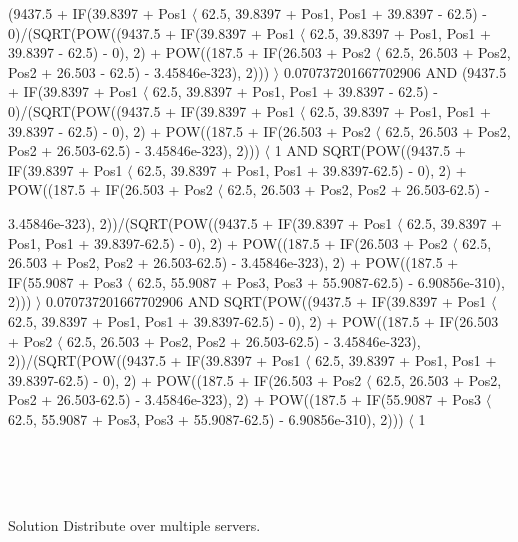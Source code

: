 \begin{frame}[plain]
(9437.5 + IF(39.8397 + Pos1 $\langle$ 62.5, 39.8397 + Pos1, Pos1 + 39.8397 - 62.5) - 0)/(SQRT(POW((9437.5 + IF(39.8397 + Pos1 $\langle$ 62.5, 39.8397 + Pos1, Pos1 + 39.8397 - 62.5) - 0), 2) + POW((187.5 + IF(26.503 + Pos2 $\langle$ 62.5, 26.503 + Pos2, Pos2 + 26.503 - 62.5) - 3.45846e-323), 2))) $\rangle$ 0.070737201667702906 AND (9437.5 + IF(39.8397 + Pos1 $\langle$ 62.5, 39.8397 + Pos1, Pos1 + 39.8397 - 62.5) - 0)/(SQRT(POW((9437.5 + IF(39.8397 + Pos1 $\langle$ 62.5, 39.8397 + Pos1, Pos1 + 39.8397 - 62.5) - 0), 2) + POW((187.5 + IF(26.503 + Pos2 $\langle$ 62.5, 26.503 + Pos2, Pos2 + 26.503-62.5) - 3.45846e-323), 2))) $\langle$ 1 AND SQRT(POW((9437.5 + IF(39.8397 + Pos1 $\langle$ 62.5, 39.8397 + Pos1, Pos1 + 39.8397-62.5) - 0), 2) + POW((187.5 + IF(26.503 + Pos2 $\langle$ 62.5, 26.503 + Pos2, Pos2 + 26.503-62.5) -
\end{frame}

\begin{frame}[plain]
3.45846e-323), 2))/(SQRT(POW((9437.5 + IF(39.8397 + Pos1 $\langle$ 62.5, 39.8397 + Pos1, Pos1 + 39.8397-62.5) - 0), 2) + POW((187.5 + IF(26.503 + Pos2 $\langle$ 62.5, 26.503 + Pos2, Pos2 + 26.503-62.5) - 3.45846e-323), 2) + POW((187.5 + IF(55.9087 + Pos3 $\langle$ 62.5, 55.9087 + Pos3, Pos3 + 55.9087-62.5) - 6.90856e-310), 2))) $\rangle$ 0.070737201667702906 AND SQRT(POW((9437.5 + IF(39.8397 + Pos1 $\langle$ 62.5, 39.8397 + Pos1, Pos1 + 39.8397-62.5) - 0), 2) + POW((187.5 + IF(26.503 + Pos2 $\langle$ 62.5, 26.503 + Pos2, Pos2 + 26.503-62.5) - 3.45846e-323), 2))/(SQRT(POW((9437.5 + IF(39.8397 + Pos1 $\langle$ 62.5, 39.8397 + Pos1, Pos1 + 39.8397-62.5) - 0), 2) + POW((187.5 + IF(26.503 + Pos2 $\langle$ 62.5, 26.503 + Pos2, Pos2 + 26.503-62.5) - 3.45846e-323), 2) + POW((187.5 + IF(55.9087 + Pos3 $\langle$ 62.5, 55.9087 + Pos3, Pos3 + 55.9087-62.5) - 6.90856e-310), 2))) $\langle$ 1
\end{frame}

\begin{frame}[plain]
  \hspace{2.5cm}{\Large Very large amount of data to search} \\
  \hspace{2cm}{\Large + Complicated SQL query} \\
  \hspace{2cm}{\Large + Multiple users} \\
  \vspace{1cm}
  \begin{alertblock}{Solution}
    \centering
    \vspace{0.5cm}
    {\Large Distribute over multiple servers.}
    \vspace{0.5cm}
  \end{alertblock}
\end{frame}

